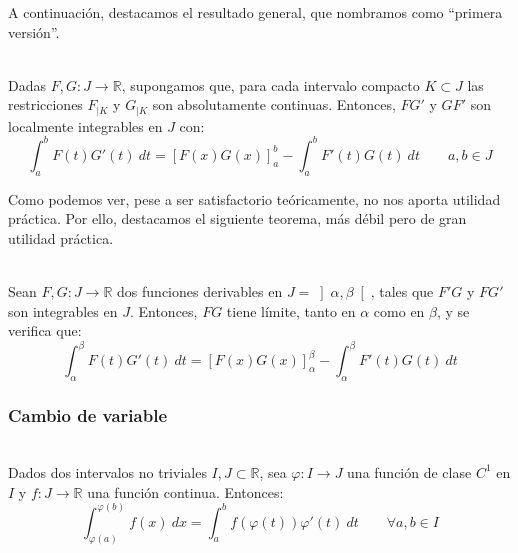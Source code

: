 A continuación, destacamos el resultado general, que nombramos como ``primera versión''.

\begin{teo}\ \\
    Dadas $F,G:J\rightarrow\mathbb{R}$, supongamos que, para cada intervalo compacto $K\subset J$ las restricciones $F_{\big|K}$ y $G_{\big|K}$ son absolutamente continuas. Entonces, $FG'$ y $GF'$ son localmente integrables en $J$ con:
    \begin{equation*}
        \displaystyle\int_{a}^{b} F(t)G'(t)~dt = {[F(x)G(x)]}_a^b - \displaystyle\int_{a}^{b} F'(t)G(t)~dt \qquad a,b\in J
    \end{equation*}
\end{teo}

Como podemos ver, pese a ser satisfactorio teóricamente, no nos aporta utilidad práctica. Por ello, destacamos el siguiente teorema, más débil pero de gran utilidad práctica.

\begin{teo}\ \\
    Sean $F,G:J\rightarrow\mathbb{R}$ dos funciones derivables en $J=\left]\alpha,\beta\right[$, tales que $F'G$ y $FG'$ son integrables en $J$. Entonces, $FG$ tiene límite, tanto en $\alpha$ como en $\beta$, y se verifica que:
    \begin{equation*}
        \displaystyle\int_{\alpha}^{\beta} F(t)G'(t)~dt = {[F(x)G(x)]}_\alpha^\beta - \displaystyle\int_{\alpha}^{\beta} F'(t)G(t)~dt 
    \end{equation*}
\end{teo}

\subsubsection{Cambio de variable}
\begin{teo}\ \\
    Dados dos intervalos no triviales $I,J\subset \mathbb{R}$, sea $\varphi:I\rightarrow J$ una función de clase $C^1$ en $I$ y $f:J\rightarrow\mathbb{R}$ una función continua. Entonces:
    \begin{equation*}
        \displaystyle\int_{\varphi(a)}^{\varphi(b)} f(x)~dx = \displaystyle\int_{a}^{b} f(\varphi(t))\varphi'(t)~dt\qquad \forall a,b\in I 
    \end{equation*}
\end{teo}

